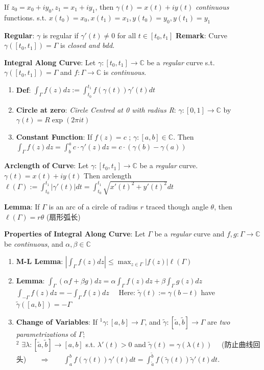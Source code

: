 \documentclass[9pt]{article}
\begin{document}
\quad If {\footnotesize $z_0=x_0+iy_0,z_1=x_1+iy_1$, then $\gamma(t)=x(t)+iy(t)$ \textit{continuous} functions. s.t. $x(t_0)=x_0,x(t_1)=x_1,y(t_0)=y_0,y(t_1)=y_1$}

\quad \textbf{Regular}: $\gamma$ is regular if $\gamma'(t)\ne0$ for all $t\in[t_0,t_1]$ \qquad \textbf{Remark}: Curve $\gamma([t_0,t_1])=\Gamma$ is \textit{closed and bdd}.

\textbf{Integral Along Curve}: Let $\gamma:[t_0,t_1]\to\mathbb{C}$ be a \textit{regular} curve s.t. $\gamma([t_0,t_1])=\Gamma$ and $f:\Gamma\to\mathbb{C}$ is \textit{continuous}.

\begin{enumerate}[itemsep=-2pt, topsep=-2pt]
    \item \textbf{Def}: $\int_{\Gamma}f(z)dz:=\int_{t_0}^{t_1}f(\gamma(t))\gamma'(t)dt$
    \item \textbf{Circle at zero}: \textit{Circle Centred at 0 with radius R}: $\gamma:[0,1]\to\mathbb{C}$ by $\gamma(t)=R\exp(2\pi it)$
    \item \textbf{Constant Function}: If $f(z)=c$ ; $\gamma:[a,b]\in\mathbb{C}$. Then $\int_{\Gamma}f(z)dz=\int^a_b c\cdot\gamma'(z) dz = c\cdot(\gamma(b)-\gamma(a))$
\end{enumerate}

\textbf{Arclength of Curve}: {\small Let $\gamma:[t_0,t_1]\to\mathbb{C}$ be a \textit{regular} curve. $\gamma(t)=x(t)+iy(t)$ Then arclength $\ell(\Gamma):=\int_{t_0}^{t_1}|\gamma'(t)|dt=\int^{t_1}_{t_0}\sqrt{x'(t)^2+y'(t)^2}dt$}

\quad \textbf{Lemma}: If $\Gamma$ is an arc of a circle of radius $r$ traced though angle $\theta$, then $\ell(\Gamma)=r\theta$ {\small (扇形弧长)}

\textbf{Properties of Integral Along Curve}: Let $\Gamma$ be a \textit{regular} curve and $f,g:\Gamma\to\mathbb{C}$ be \textit{continuous}, and $\alpha,\beta\in\mathbb{C}$

\begin{enumerate}[itemsep=-2pt, topsep=-2pt]
    \item \textbf{M-L Lemma}: $|\int_{\Gamma}f(z)dz|\leq \max_{z\in\Gamma}|f(z)|\ell(\Gamma)$
    \item \textbf{Lemma}: $\int_{\Gamma}(\alpha f+\beta g)dz=\alpha\int_{\Gamma}f(z)dz+\beta\int_{\Gamma}g(z)dz$ \qquad $\int_{-\Gamma}f(z)dz=-\int_{\Gamma}f(z)dz$ \ \ {\scriptsize Here: $\widetilde{\gamma}(t):=\gamma(b-t)$ have $\widetilde{\gamma}([a,b])=-\Gamma$}
    \item \textbf{Change of Variables}: {\small If $^1\gamma:[a,b]\to\Gamma$, and $\widetilde{\gamma}:[\widetilde{a},\widetilde{b}]\to\Gamma$ are \textit{two parametrizations} of $\Gamma$;} \\
    {\small $^2$ $\exists\lambda:[\widetilde{a},\widetilde{b}]\to[a,b]$ s.t. $\lambda'(t)>0$ and $\widetilde{\gamma}(t)=\gamma(\lambda(t))$ \ \ {\scriptsize (防止曲线回头)} \ \ \ $\Rightarrow$ \ \ \ $\int^b_a f(\gamma(t))\gamma'(t)dt=\int^{\widetilde{b}}_{\widetilde{a}}f(\widetilde{\gamma}(t))\widetilde{\gamma}'(t)dt$}.
\end{enumerate}
\end{document}

